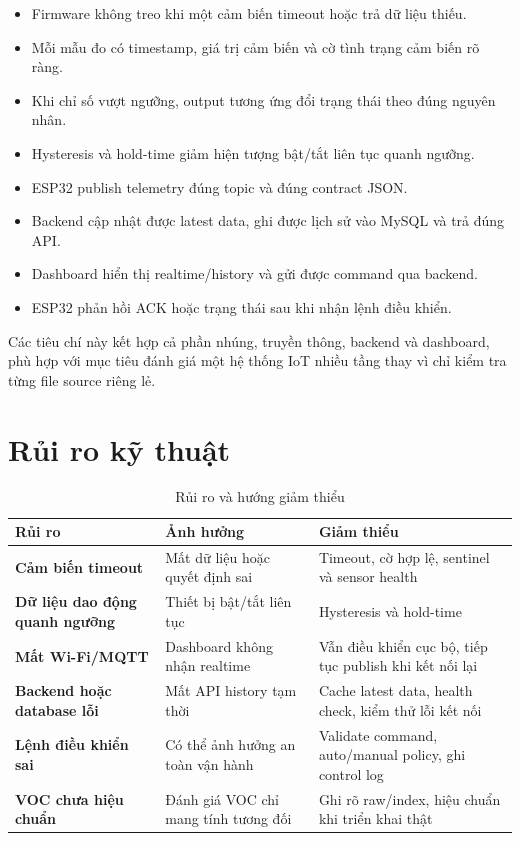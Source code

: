 \begin{itemize}[leftmargin=2em]
    \item Firmware không treo khi một cảm biến timeout hoặc trả dữ liệu thiếu.
    \item Mỗi mẫu đo có timestamp, giá trị cảm biến và cờ tình trạng cảm biến rõ ràng.
    \item Khi chỉ số vượt ngưỡng, output tương ứng đổi trạng thái theo đúng nguyên nhân.
    \item Hysteresis và hold-time giảm hiện tượng bật/tắt liên tục quanh ngưỡng.
    \item ESP32 publish telemetry đúng topic và đúng contract JSON.
    \item Backend cập nhật được latest data, ghi được lịch sử vào MySQL và trả đúng API.
    \item Dashboard hiển thị realtime/history và gửi được command qua backend.
    \item ESP32 phản hồi ACK hoặc trạng thái sau khi nhận lệnh điều khiển.
\end{itemize}

Các tiêu chí này kết hợp cả phần nhúng, truyền thông, backend và dashboard, phù hợp với mục tiêu đánh giá một hệ thống IoT nhiều tầng thay vì chỉ kiểm tra từng file source riêng lẻ.

\section{Rủi ro kỹ thuật}

\begin{table}[H]
    \centering
    \caption{Rủi ro và hướng giảm thiểu}
    \begin{tabularx}{\textwidth}{>{\bfseries}l X X}
        \toprule
        Rủi ro & Ảnh hưởng & Giảm thiểu \\
        \midrule
        Cảm biến timeout & Mất dữ liệu hoặc quyết định sai & Timeout, cờ hợp lệ, sentinel và sensor health \\
        Dữ liệu dao động quanh ngưỡng & Thiết bị bật/tắt liên tục & Hysteresis và hold-time \\
        Mất Wi-Fi/MQTT & Dashboard không nhận realtime & Vẫn điều khiển cục bộ, tiếp tục publish khi kết nối lại \\
        Backend hoặc database lỗi & Mất API history tạm thời & Cache latest data, health check, kiểm thử lỗi kết nối \\
        Lệnh điều khiển sai & Có thể ảnh hưởng an toàn vận hành & Validate command, auto/manual policy, ghi control log \\
        VOC chưa hiệu chuẩn & Đánh giá VOC chỉ mang tính tương đối & Ghi rõ raw/index, hiệu chuẩn khi triển khai thật \\
        \bottomrule
    \end{tabularx}
\end{table}
